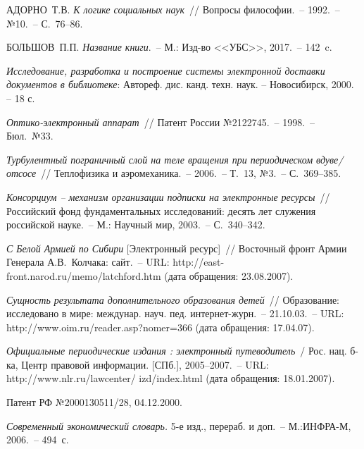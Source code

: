 \documentclass[11pt]{ubs}
\begin{document}
\begin{thebibliography}{10}

{\MakeUppercase{Адорно~Т.В.}} \textit{К логике социальных наук}~// Вопросы философии.~-- 1992.~-- №10.~-- С.~76--86.

{\MakeUppercase{Большов~П.П.}} \textit{Название книги}.~-- М.: Изд-во <<УБС>>, 2017.~-- 142~c.


 \textit{Исследование, разработка и построение системы электронной доставки документов в библиотеке}: Автореф. дис. канд. техн. наук. – Новосибирск, 2000. – 18 с.

 \textit{Оптико-электронный аппарат}~// Патент России №2122745.~-- 1998.~-- Бюл.~№33.

 \textit{Турбулентный пограничный слой на теле вращения при периодическом вдуве/отсосе}~// Теплофизика и аэромеханика.~-- 2006.~-- Т.~13, №3.~-- С.~369--385.

 \textit{Консорциум -- механизм организации подписки на электронные ресурсы}~// Российский фонд фундаментальных исследований: десять лет служения российской науке.~-- М.: Научный мир, 2003.~-- С.~340--342.

 \textit{С Белой Армией по Сибири} [Электронный ресурс]~// Восточный фронт Армии Генерала А.В.~Колчака: сайт.~-- URL: http://east-front.narod.ru/memo/latchford.htm (дата обращения: 23.08.2007).

 \textit{Сущность результата дополнительного образования детей}~// Образование: исследовано в мире: междунар. науч. пед. интернет-журн.~-- 21.10.03.~-- URL: http://www.oim.ru/reader.asp?nomer=366 (дата обращения: 17.04.07).

\textit{Официальные периодические издания : электронный путеводитель}~/ Рос. нац. б-ка, Центр правовой информации. [СПб.], 2005--2007.~-- URL:  http://www.nlr.ru/lawcenter/ izd/index.html (дата обращения: 18.01.2007).

Патент РФ №2000130511/28, 04.12.2000.

 \textit{Современный экономический словарь.} 5-е изд., перераб. и доп.~-- М.:ИНФРА-М, 2006.~-- 494~с.


\end{thebibliography}
\end{document}
